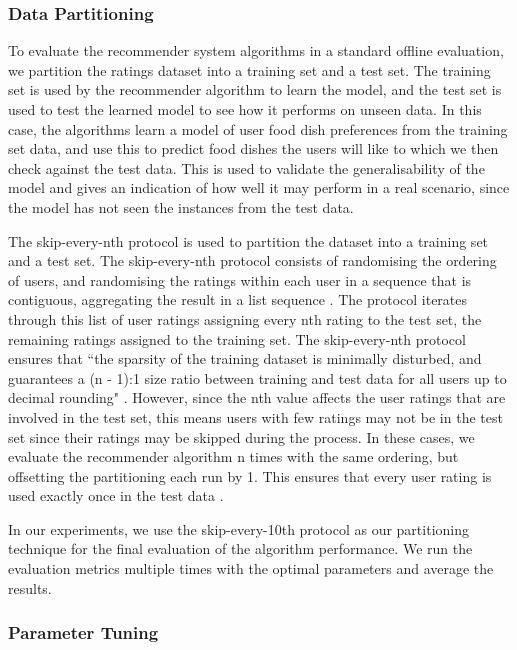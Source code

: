 \subsubsection{Data Partitioning}

To evaluate the recommender system algorithms in a standard offline evaluation, we partition the ratings dataset into a training set and a test set. The training set is used by the recommender algorithm to learn the model, and the test set is used to test the learned model to see how it performs on unseen data. In this case, the algorithms learn a model of user food dish preferences from the training set data, and use this to predict food dishes the users will like to which we then check against the test data. This is used to validate the generalisability of the model and gives an indication of how well it may perform in a real scenario, since the model has not seen the instances from the test data.

The skip-every-nth protocol \cite{zhang} is used to partition the dataset into a training set and a test set. The skip-every-nth protocol consists of randomising the ordering of users, and randomising the ratings within each user in a sequence that is contiguous, aggregating the result in a list sequence \cite{zhang}. The protocol iterates through this list of user ratings assigning every nth rating to the test set, the remaining ratings assigned to the training set. The skip-every-nth protocol ensures that ``the sparsity of the training dataset is minimally disturbed, and guarantees a (n - 1):1 size ratio between training and test data for all users up to decimal rounding" \cite{zhang}. However, since the nth value affects the user ratings that are involved in the test set, this means users with few ratings may not be in the test set since their ratings may be skipped during the process. 
 In these cases, we evaluate the recommender algorithm n times with the same ordering, but offsetting the partitioning each run by 1. This ensures that every user rating is used exactly once in the test data \cite{zhang}. 

In our experiments, we use the skip-every-10th protocol as our partitioning technique for the final evaluation of the algorithm performance. We run the evaluation metrics multiple times with the optimal parameters and average the results. 

\subsubsection{Parameter Tuning}

